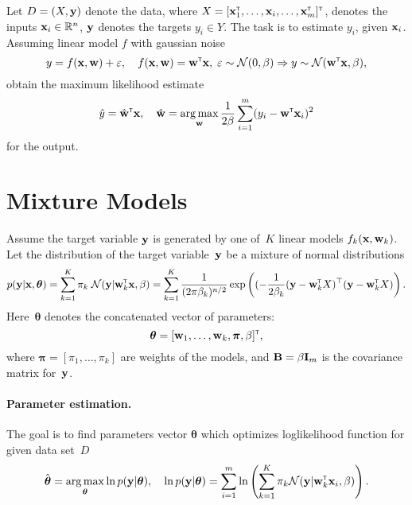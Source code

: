\documentclass[12pt]{article}
\renewcommand{\bs}{\boldsymbol{\theta}}
\newcommand{\argmax}{\mathop{\rm arg\,max}\limits}
\begin{document}
Let $D = (X, {\mathbf{y}})$ denote the data, where $X = [{\mathbf{x}}_1^{\text{\tiny\sffamily\upshape\mdseries T}}, \dots, {\mathbf{x}}_i, \dots, {\mathbf{x}}_m^{\text{\tiny\sffamily\upshape\mdseries T}}]^{\text{\tiny\sffamily\upshape\mdseries T}}$,
 denotes the inputs ${\mathbf{x}}_i\in\mathbb{R}^{n}$, ${\mathbf{y}}$ denotes the targets $y_i \in Y$. The task is to estimate $y_i$, given ${\mathbf{x}}_i$. Assuming linear model $f$ with gaussian noise
 \begin{equation*}
 y = f({\mathbf{x}}, {\mathbf{w}}) + \varepsilon, \quad f({\mathbf{x}}, {\mathbf{w}}) = {\mathbf{w}}^{\text{\tiny\sffamily\upshape\mdseries T}}{\mathbf{x}}, \; \varepsilon \sim \mathcal{N}(0,\beta) \Rightarrow y \sim \mathcal{N}({\mathbf{w}}^{\text{\tiny\sffamily\upshape\mdseries T}}{\mathbf{x}}, \beta),
 \end{equation*}
 obtain the maximum likelihood estimate
 \[\hat{y} = \hat{\w}\T\x, \quad \hat{\w} = \argmax_{\w} \frac{1}{2\beta}\sum_{i=1}^{m}(y_i - \w\T \x_i)^2 \]
 for the output.

\section{Mixture Models}
Assume the target variable ${\mathbf{y}}$ is generated by one of~$K$ linear models $f_{k}({\mathbf{x}}, {\mathbf{w}}_k)$. Let the distribution of the target variable~${\mathbf{y}}$ be a mixture of normal distributions
\begin{equation}\label{eq:mixture_models}
p(\by|\x, \bs) = \sum_{k=1}^{K}\pi_k\;\mathcal{N}(\by|\w_k\T\bx,\beta) = \sum_{k=1}^K
\frac{1}{(2\pi\beta_k)^{n/2}} \exp \left(
( -\frac{1}{2\beta_k}(\by - \w_k\T X)^{\top}(\by - \w_k\T X) \right).
\end{equation}
Here~$\bs$ denotes the concatenated vector of parameters:
\[
\bs = [\w_1,\dots,\w_k,\boldsymbol{\pi},\beta]\T,
\]
where $\boldsymbol{\pi} = [\pi_1,\dots,\pi_k]$ are weights of the models,
and ${\mathbf{B}} = \beta \mathbf{I}_m$ is the covariance matrix for~${\mathbf{y}}$.

\paragraph{Parameter estimation.}
The goal is to find parameters vector $\hat{\bs}$ which optimizes loglikelihood function for given data set~$D$
\begin{equation}\label{eq:MLE}
\hat{\bs} = \argmax_{\bs}\ln p(\by|\bs), \quad \ln p(\by|\bs) = \sum_{i=1}^{m}\ln\left( \sum_{k=1}^K  \pi_k\mathcal{N}(\by|\w\T_{k}\x_i,\beta) \right).
\end{equation}
\end{document}

